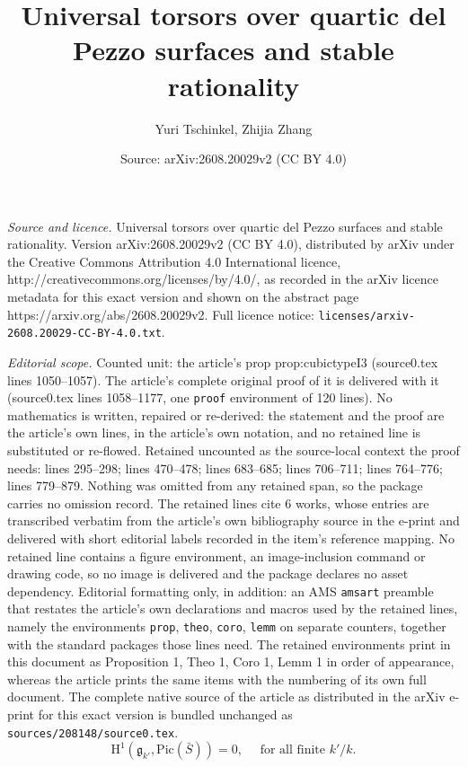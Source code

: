 \documentclass[10pt,a4paper]{amsart}
\title{Universal torsors over quartic del Pezzo surfaces and stable rationality}
\author{Yuri Tschinkel, Zhijia Zhang}
\date{Source: arXiv:2608.20029v2 (CC BY 4.0)}
\def\Pic{\mathrm{Pic}}
\def\rH{{\mathrm H}}
\begin{document}
\maketitle

\noindent\emph{Source and licence.} Universal torsors over quartic del Pezzo surfaces and stable rationality. Version arXiv:2608.20029v2 (CC BY 4.0), distributed by arXiv under the Creative Commons Attribution 4.0 International licence, http://creativecommons.org/licenses/by/4.0/, as recorded in the arXiv licence metadata for this exact version and shown on the abstract page https://arxiv.org/abs/2608.20029v2. Full licence notice: \texttt{licenses/arxiv-2608.20029-CC-BY-4.0.txt}.\par\smallskip

\noindent\textit{Editorial scope.} Counted unit: the article's prop prop:cubictypeI3 (source0.tex lines 1050--1057). The article's complete original proof of it is delivered with it (source0.tex lines 1058--1177, one \texttt{proof} environment of 120 lines). No mathematics is written, repaired or re-derived: the statement and the proof are the article's own lines, in the article's own notation, and no retained line is substituted or re-flowed.  Retained uncounted as the source-local context the proof needs: lines 295--298; lines 470--478; lines 683--685; lines 706--711; lines 764--776; lines 779--879.  Nothing was omitted from any retained span, so the package carries no omission record.  The retained lines cite 6 works, whose entries are transcribed verbatim from the article's own bibliography source in the e-print and delivered with short editorial labels recorded in the item's reference mapping.  No retained line contains a figure environment, an image-inclusion command or drawing code, so no image is delivered and the package declares no asset dependency.  Editorial formatting only, in addition: an AMS \texttt{amsart} preamble that restates the article's own declarations and macros used by the retained lines, namely the environments \texttt{prop}, \texttt{theo}, \texttt{coro}, \texttt{lemm} on separate counters, together with the standard packages those lines need.  The retained environments print in this document as Proposition 1, Theo 1, Coro 1, Lemm 1 in order of appearance, whereas the article prints the same items with the numbering of its own full document.  The complete native source of the article as distributed in the arXiv e-print for this exact version is bundled unchanged as \texttt{sources/208148/source0.tex}.
    \begin{equation} 
    \label{eqn:h1}
\rH^1(\mathfrak g_{k'}, \Pic(\bar{S}))=0, \quad \text{ for all finite }  k'/k. 
    \end{equation}
\end{document}
